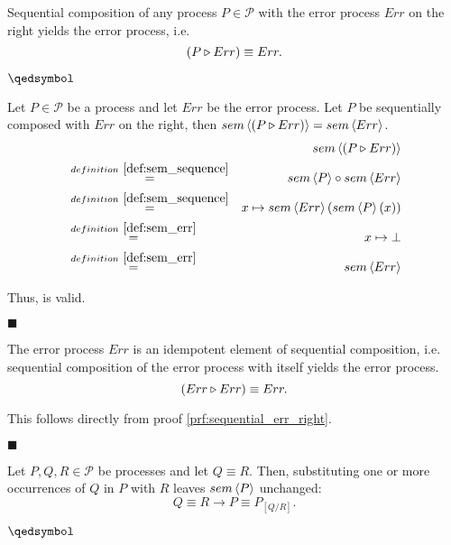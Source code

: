 \begin{theorem}
\label{thm:sequential_err_right}
Sequential composition of any process $P \in \mathcal{P}$ with the error process $Err$ on the right yields the error process, i.e.
\begin{equation*}
  \left( P \triangleright Err \right) \equiv Err.
\end{equation*}

\hfill$\qedsymbol$
\end{theorem}


\begin{myproof}
\label{prf:sequential_err_right}
Let $P \in \mathcal{P}$ be a process and let $Err$ be the error process. Let $P$ be sequentially composed with $Err$ on the right, then $sem \left\langle \left( P \triangleright Err \right) \right\rangle = sem \left\langle Err \right\rangle$.
\begin{eqnarray*}
  & & \sem{\sequence{P}{Err}} \\
    & \overset{\defref{def:sem_sequence}}{=} & \sem{P} \circ \sem{Err} \\
    & \overset{\defref{def:sem_sequence}}{=} & x \mapsto \sem{Err} \left( \sem{P} \left( x \right) \right) \\
    & \overset{\defref{def:sem_err}}{=} & x \mapsto \bot \\
    & \overset{\defref{def:sem_err}}{=} & \sem{Err}
\end{eqnarray*}

Thus,  is valid.

\hfill$\blacksquare$
\end{myproof}


\begin{corollary}
\label{thm:idempotence_err}
The error process $Err$ is an idempotent element of sequential composition, i.e. sequential composition of the error process with itself yields the error process.
\begin{equation*}
  \left( Err \triangleright Err \right) \equiv Err.
\end{equation*}

This follows directly from proof \ref{prf:sequential_err_right}.

\hfill$\blacksquare$
\end{corollary}


\begin{theorem}
\label{thm:substitution_equivalence}
Let $P, Q, R \in \mathcal{P}$ be processes and let $Q \equiv R$. Then, substituting one or more occurrences of $Q$ in $P$ with $R$ leaves $sem \left\langle P \right\rangle$ unchanged:
  \begin{equation*}
    Q \equiv R \rightarrow P \equiv P_{\left[ Q / R \right]}.
  \end{equation*}
  
  \hfill$\qedsymbol$
\end{theorem}

